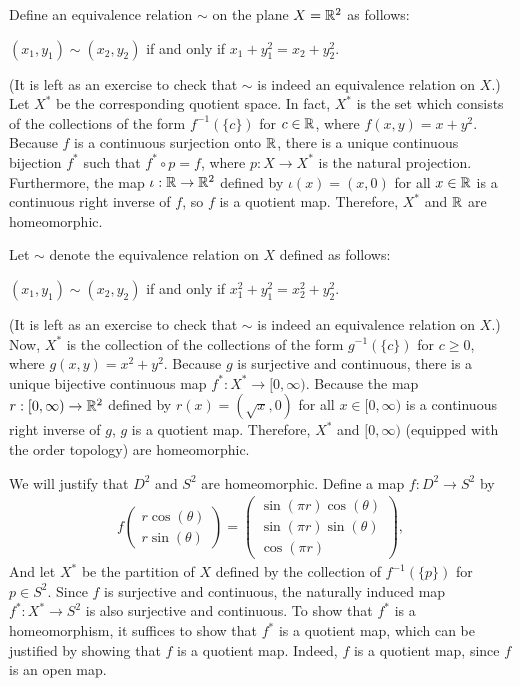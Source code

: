 \begin{exmp}
    Define an equivalence relation $\sim$ on the plane $X={\mathbb{R}}^2$ as follows:
    \begin{center}
        $(x_1, y_1)\sim(x_2, y_2)$ if and only if $x_1+y_1^2=x_2+y_2^2$.
    \end{center}
    \color{brown}(It is left as an exercise to check that $\sim$ is indeed an equivalence relation on $X$.) \color{black}
    Let $X^*$ be the corresponding quotient space.
    In fact, $X^*$ is the set which consists of the collections of the form $f^{-1}(\{c\})$ for $c\in{\mathbb{R}}$, where $f(x, y)=x+y^2$.
    Because $f$ is a continuous surjection onto ${\mathbb{R}}$, there is a unique continuous bijection $f^*$ such that $f^*\circ p=f$, where $p: X\rightarrow X^*$ is the natural projection.
    Furthermore, the map $\iota: {\mathbb{R}}\rightarrow{\mathbb{R}}^2$ defined by $\iota(x)=(x, 0)$ for all $x\in{\mathbb{R}}$ is a continuous right inverse of $f$, so $f$ is a quotient map.
    Therefore, $X^*$ and ${\mathbb{R}}$ are homeomorphic.

    Let $\sim$ denote the equivalence relation on $X$ defined as follows:
    \begin{center}
        $(x_1, y_1)\sim(x_2, y_2)$ if and only if $x_1^2+y_1^2=x_2^2+y_2^2$.
    \end{center}
    \color{brown}(It is left as an exercise to check that $\sim$ is indeed an equivalence relation on $X$.) \color{black}
    Now, $X^*$ is the collection of the collections of the form $g^{-1}(\{c\})$ for $c\geq 0$, where $g(x, y)=x^2+y^2$.
    Because $g$ is surjective and continuous, there is a unique bijective continuous map $f^*: X^*\rightarrow[0, \infty)$.
    Because the map $r: [0, \infty)\rightarrow{\mathbb{R}}^2$ defined by $r(x)=(\sqrt{x}, 0)$ for all $x\in[0, \infty)$ is a continuous right inverse of $g$, $g$ is a quotient map.
    Therefore, $X^*$ and $[0, \infty)$ (equipped with the order topology) are homeomorphic.
\end{exmp}
\begin{exmp}
    We will justify that $D^2$ and $S^2$ are homeomorphic.
    Define a map $f: D^2\rightarrow S^2$ by
    \begin{align*}
        f
        \begin{pmatrix}
            r\cos(\theta)\\
            r\sin(\theta)
        \end{pmatrix}
        =
        \begin{pmatrix}
            \sin(\pi r)\cos(\theta)\\
            \sin(\pi r)\sin(\theta)\\
            \cos(\pi r)
        \end{pmatrix},
    \end{align*}
    And let $X^*$ be the partition of $X$ defined by the collection of $f^{-1}(\{p\})$ for $p\in S^2$.
    Since $f$ is surjective and continuous, the naturally induced map $f^*: X^*\rightarrow S^2$ is also surjective and continuous.
    To show that $f^*$ is a homeomorphism, it suffices to show that $f^*$ is a quotient map, which can be justified by showing that $f$ is a quotient map.
    Indeed, $f$ is a quotient map, since $f$ is an open map.
\end{exmp}
